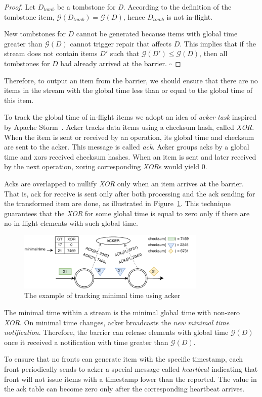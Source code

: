 \begin{proof}
  Let $D_{tomb}$ be a tombstone for {\it D}. According to the definition of the tombstone item, $\mathcal{G} (D_{tomb}) = \mathcal{G} (D)$, hence $D_{tomb}$ is not in-flight.
  
  New tombstones for $D$ cannot be generated because items with global time greater than $\mathcal{G} (D)$ cannot trigger repair that affects $D$. This implies that if the stream does not contain items $D\prime$ such that $\mathcal{G} (D\prime) \le \mathcal{G} (D)$, then all tombstones for $D$ had already arrived at the barrier. $\square$
\end{proof}

Therefore, to output an item from the barrier, we should ensure that there are no items in the stream with the global time less than or equal to the global time of this item.

To track the global time of in-flight items we adopt an idea of {\it acker task} inspired by Apache Storm~\cite{apache:storm}. Acker tracks data items using a checksum hash, called {\it XOR}. When the item is sent or received by an operation, its global time and checksum are sent to the acker. This message is called {\it ack}. Acker groups acks by a global time and xors received checksum hashes. When an item is sent and later received by the next operation, xoring corresponding {\it XOR}s would yield 0.

Acks are overlapped to nullify {\it XOR} only when an item arrives at the barrier. That is, ack for receive is sent only after both processing and the ack sending for the transformed item are done, as illustrated in Figure~\ref{acker}. This technique guarantees that the {\it XOR} for some global time is equal to zero only if there are no in-flight elements with such global time.

\begin{figure}[ht]
  \centering
  \includegraphics[width=0.8\textwidth]{pics/acker}
  \caption{The example of tracking minimal time using acker}
  \label {acker}
\end{figure}

The minimal time within a stream is the minimal global time with non-zero {\it XOR}. On minimal time changes, acker broadcasts the {\it new minimal time notification}. Therefore, the barrier can release elements with global time $\mathcal{G} (D)$ once it received a notification with time greater than $\mathcal{G} (D)$.

To ensure that no fronts can generate item with the specific timestamp, each front periodically sends to acker a special message called {\it heartbeat} indicating that front will not issue items with a timestamp lower than the reported. The value in the ack table can become zero only after the corresponding heartbeat arrives.
